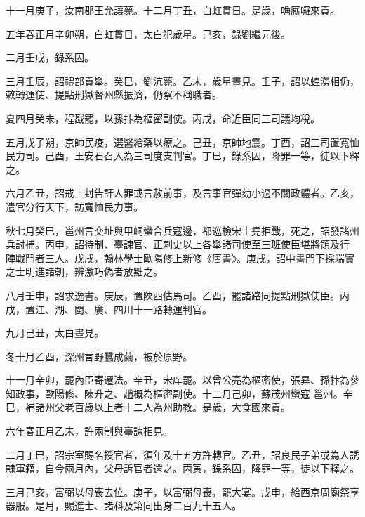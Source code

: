 \begin{pinyinscope}
 十一月庚子，汝南郡王允讓薨。十二月丁丑，白虹貫日。是歲，唃廝囉來貢。



 五年春正月辛卯朔，白虹貫日，太白犯歲星。己亥，錄劉繼元後。



 二月壬戌，錄系囚。



 三月壬辰，詔禮部貢舉。癸巳，劉沆薨。乙未，歲星晝見。壬子，詔以蝗澇相仍，敕轉運使、提點刑獄督州縣振濟，仍察不稱職者。



 夏四月癸未，程戡罷，以孫抃為樞密副使。丙戌，命近臣同三司議均稅。



 五月戊子朔，京師民疫，選醫給藥以療之。己丑，京師地震。丁酉，詔三司置寬恤民力司。己酉，王安石召入為三司度支判官。丁巳，錄系囚，降罪一等，徒以下釋之。



 六月乙丑，詔戒上封告訐人罪或言赦前事，及言事官彈劾小過不關政體者。乙亥，遣官分行天下，訪寬恤民力事。



 秋七月癸巳，邕州言交址與甲峒蠻合兵寇邊，都巡檢宋士堯拒戰，死之，詔發諸州兵討捕。丙申，詔待制、臺諫官、正刺史以上各舉諸司使至三班使臣堪將領及行
 陣戰鬥者三人。戊戌，翰林學士歐陽修上新修《唐書》。庚戌，詔中書門下採端實之士明進諸朝，辨激巧偽者放黜之。



 八月壬申，詔求逸書。庚辰，置陜西估馬司。乙酉，罷諸路同提點刑獄使臣。丙戌，置江、湖、閩、廣、四川十一路轉運判官。



 九月己丑，太白晝見。



 冬十月乙酉，深州言野蠶成繭，被於原野。



 十一月辛卯，罷內臣寄遷法。辛丑，宋庠罷。以曾公亮為樞密使，張昪、孫抃為參知政事，歐陽修、陳升之、趙概為樞密副使。十二月己卯，蘇茂州蠻寇
 邕州。辛巳，補諸州父老百歲以上者十二人為州助教。是歲，大食國來貢。



 六年春正月乙未，許兩制與臺諫相見。



 二月丁巳，詔宗室賜名授官者，須年及十五方許轉官。乙丑，詔良民子弟或為人誘隸軍籍，自今兩月內，父母訴官者還之。丙寅，錄系囚，降罪一等，徒以下釋之。



 三月己亥，富弼以母喪去位。庚子，以富弼母喪，罷大宴。戊申，給西京周廟祭享器服。是月，賜進士、諸科及第同出身二百九十五人。




\end{pinyinscope}
